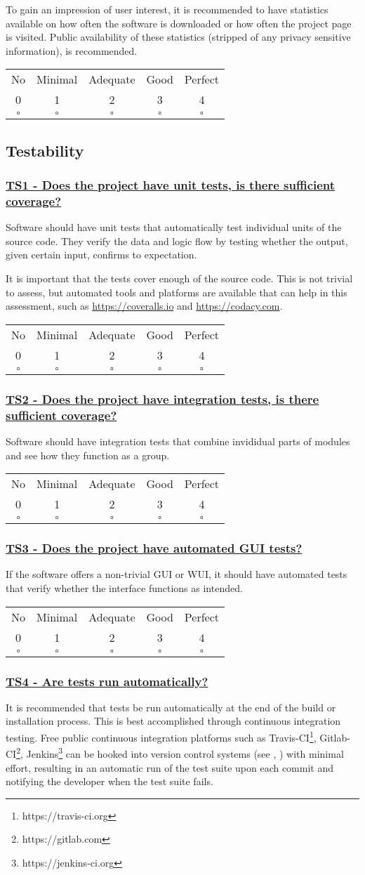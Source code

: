 \documentclass[a4paper,11pt]{article}
\newcommand{\criterion}[2]{\subsubsection*{\underline{#1 - #2}}\label{id:#1}}
\newcommand\CheckTable{%
  \begin{tabular}{ccccc}
    No & Minimal & Adequate & Good & Perfect \\
    0 & 1 & 2 & 3 & 4 \\
    \hline
    $\square$ & $\square$ & $\square$ & $\square$ & $\square$ \\
  \end{tabular}%
}
\newcommand{\refcrit}[1]{%
 \framebox[1.1\width]{\hyperref[id:#1]{#1}}
}
\begin{document}
To gain an impression of user interest, it is recommended to have statistics
available on how often the software is downloaded or how often the project page
is visited. Public availability of these statistics (stripped of any privacy
sensitive information), is recommended.

\CheckTable

\subsection{Testability}\label{sec:tes}

\newcommand{\tsOneID}{TS1}
\newcommand{\tsOneText}{Does the project have unit tests, is there sufficient coverage?}
\criterion{\tsOneID}{\tsOneText}

Software should have unit tests that automatically test individual units of the
source code. They verify the data and logic flow by testing whether the output,
given certain input, confirms to expectation.

It is important that the tests cover enough of the source code. This is not
trivial to assess, but automated tools
and platforms are available that can help in this assessment, such as
\url{https://coveralls.io} and \url{https://codacy.com}.

\CheckTable

\newcommand{\tsTwoID}{TS2}
\newcommand{\tsTwoText}{Does the project have integration tests, is there sufficient coverage?}
\criterion{\tsTwoID}{\tsTwoText}

Software should have integration tests that combine invididual parts of modules and see how they function
as a group.

\CheckTable

\newcommand{\tsThreeID}{TS3}
\newcommand{\tsThreeText}{Does the project have automated GUI tests?}
\criterion{\tsThreeID}{\tsThreeText}

If the software offers a non-trivial GUI or WUI, it should have automated tests
that verify whether the interface functions as intended.

\CheckTable

\newcommand{\tsFourID}{TS4}
\newcommand{\tsFourText}{Are tests run automatically?}
\criterion{\tsFourID}{\tsFourText}

It is recommended that tests be run automatically at the end of the build
or installation process. This is best accomplished through continuous
integration testing. Free public continuous integration
platforms such as Travis-CI\footnote{https://travis-ci.org},
Gitlab-CI\footnote{https://gitlab.com},
Jenkins\footnote{https://jenkins-ci.org} can be hooked into version control
systems (see \refcrit{AC1}, \refcrit{AC2}) with minimal effort, resulting in an
automatic run of the test suite upon each commit and notifying the developer
when the test suite fails.
\end{document}
